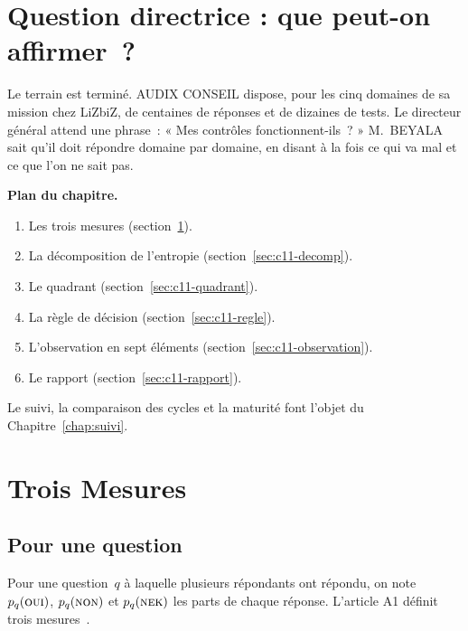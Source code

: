 \bigskip

\section*{Question directrice : que peut-on affirmer~?}

Le terrain est terminé. AUDIX CONSEIL dispose, pour les cinq domaines de sa
mission chez LiZbiZ, de centaines de réponses et de dizaines de tests. Le
directeur général attend une phrase~: « Mes contrôles fonctionnent-ils~? »
M.~BEYALA sait qu'il doit répondre domaine par domaine, en disant à la fois
ce qui va mal et ce que l'on ne sait pas.

\medskip
\textbf{Plan du chapitre.}
\begin{enumerate}
    \item Les trois mesures (section~\ref{sec:c11-mesures}).
    \item La décomposition de l'entropie (section~\ref{sec:c11-decomp}).
    \item Le quadrant (section~\ref{sec:c11-quadrant}).
    \item La règle de décision (section~\ref{sec:c11-regle}).
    \item L'observation en sept éléments (section~\ref{sec:c11-observation}).
    \item Le rapport (section~\ref{sec:c11-rapport}).
\end{enumerate}
Le suivi, la comparaison des cycles et la maturité font l'objet du
Chapitre~\ref{chap:suivi}.

\separateur

\section{Trois Mesures}
\label{sec:c11-mesures}

\subsection{Pour une question}

Pour une question~$q$ à laquelle plusieurs répondants ont répondu, on note
$p_q(\textsc{oui})$, $p_q(\textsc{non})$ et $p_q(\textsc{nek})$ les parts de chaque réponse. L'article
A1 définit trois mesures~\cite{minka2026nek}.

